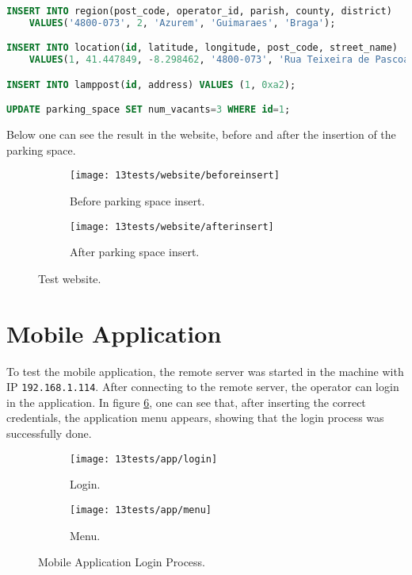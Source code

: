 \begin{lstlisting}[language=SQL, caption={Test Website: add parking space to the database.}, label={lst:testwebsite}]
INSERT INTO region(post_code, operator_id, parish, county, district) 
	VALUES('4800-073', 2, 'Azurem', 'Guimaraes', 'Braga');

INSERT INTO location(id, latitude, longitude, post_code, street_name) 
	VALUES(1, 41.447849, -8.298462, '4800-073', 'Rua Teixeira de Pascoais');

INSERT INTO lamppost(id, address) VALUES (1, 0xa2);

UPDATE parking_space SET num_vacants=3 WHERE id=1;
\end{lstlisting}

Below one can see the result in the website, before and after the insertion of the parking space.

\begin{figure}[H]
	\centering
	\begin{subfigure}{.4\textwidth}
		\centering
		\texttt{[image: 13tests/website/beforeinsert]}
		\caption{Before parking space insert.}
		\label{fig:login}
	\end{subfigure}%
	\begin{subfigure}{.4\textwidth}
		\centering
		\texttt{[image: 13tests/website/afterinsert]}
		\caption{After parking space insert.}
		\label{fig:menu}
	\end{subfigure}
	\caption{Test website.}
	\label{fig:applogin}
\end{figure}

\clearpage
\section{Mobile Application}

To test the mobile application, the remote server was started in the machine with IP \verb|192.168.1.114|. After connecting to the remote server, the operator can login in the application. In figure \ref{fig:applogin}, one can see that, after inserting the correct credentials, the application menu appears, showing that the login process was successfully done.

\begin{figure}[H]
	\centering
	\begin{subfigure}{.4\textwidth}
		\centering
		\texttt{[image: 13tests/app/login]}
		\caption{Login.}
		\label{fig:login}
	\end{subfigure}%
	\begin{subfigure}{.4\textwidth}
		\centering
		\texttt{[image: 13tests/app/menu]}
		\caption{Menu.}
		\label{fig:menu}
	\end{subfigure}
	\caption{Mobile Application Login Process.}
	\label{fig:applogin}
\end{figure}

